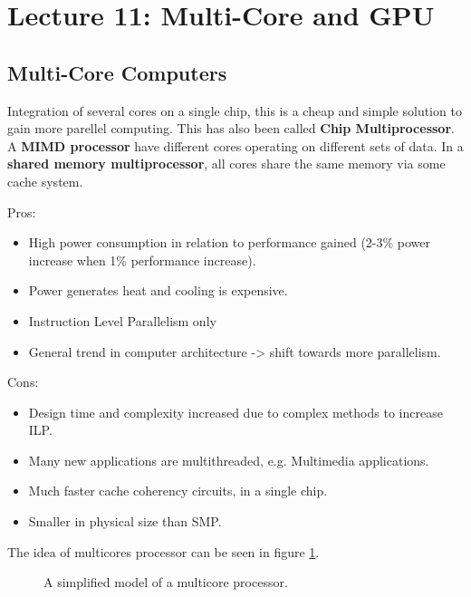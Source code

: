 \section{Lecture 11: Multi-Core and GPU}
\subsection{Multi-Core Computers}
Integration of several cores on a single chip, this is a cheap and simple solution to gain more parellel computing. This has also been called \textbf{Chip Multiprocessor}. A \textbf{MIMD processor} have different cores operating on different sets of data. In a \textbf{shared memory multiprocessor}, all cores share the same memory via some cache system.

Pros:
\begin{itemize}
\item High power consumption in relation to performance gained (2-3\% power increase when 1\% performance increase).
\item Power generates heat and cooling is expensive.
\item Instruction Level Parallelism only
\item General trend in computer architecture -> shift towards more parallelism.
\newline
\end{itemize}

Cons:
\begin{itemize}
\item Design time and complexity increased due to complex methods to increase ILP.
\item Many new applications are multithreaded, e.g. Multimedia applications.
\item Much faster cache coherency circuits, in a single chip.
\item Smaller in physical size than SMP.
\end{itemize}

The idea of multicores processor can be seen in figure \ref{fig:simple-multi-model}.

\begin{figure}[H]
  \centering
  \caption{A simplified model of a multicore processor.}
  \label{fig:simple-multi-model}
\end{figure}

